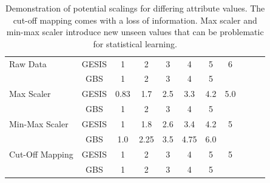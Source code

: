 \vspace{0.48cm}
\begin{table}[ht]
    \begin{center}
	\captionsetup{width= 400pt}
            {\footnotesize
            \begin{tabular}{l|c|ccccccccc}
                \hline \hline
		Raw Data & GESIS & 1 & 2 & 3 & 4 & 5 & 6 \\
                     & GBS & 1 & 2 & 3 & 4 & 5 & \\
                \hline
		Max Scaler & GESIS & 0.83 & 1.7 & 2.5 & 3.3 & 4.2 & 5.0 \\
                     & GBS & 1 & 2 & 3 & 4 & 5 & \\
                \hline
		Min-Max Scaler & GESIS & 1 & 1.8 & 2.6 & 3.4 & 4.2 & 5 \\
                     & GBS & 1.0 & 2.25 & 3.5 & 4.75 & 6.0 & \\
                \hline
		Cut-Off Mapping & GESIS & 1 & 2 & 3 & 4 & 5 & 5 \\
                     & GBS & 1 & 2 & 3 & 4 & 5 & \\
	     \hline \hline
            \end{tabular}}
        \caption{Demonstration of potential scalings for differing attribute values. The cut-off mapping comes with a loss of information. Max scaler and min-max scaler introduce new unseen values that can be problematic for statistical learning.}
\label{Tab:DescripStatsRawData}
\end{center}
\end{table}

